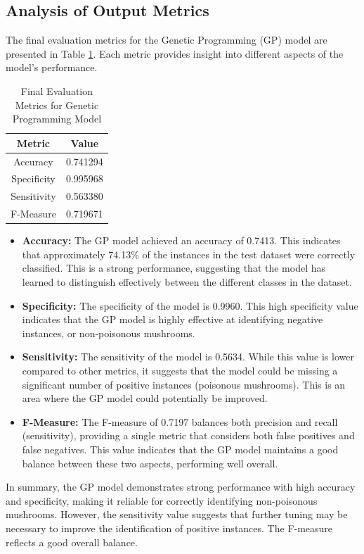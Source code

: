 \documentclass{article}
\begin{document}
\subsection{Analysis of Output Metrics}
The final evaluation metrics for the Genetic Programming (GP) model are presented in Table \ref{tab:gp_final_results}. Each metric provides insight into different aspects of the model's performance.

\begin{table}[h!]
    \centering
    \label{tab:gp_final_results}
    \begin{tabular}{|c|c|}
        \hline
        \textbf{Metric} & \textbf{Value} \\
        \hline
        Accuracy & 0.741294 \\
        Specificity & 0.995968 \\
        Sensitivity & 0.563380 \\
        F-Measure & 0.719671 \\
        \hline
    \end{tabular}
     \caption{Final Evaluation Metrics for Genetic Programming Model}
\end{table}

\begin{itemize}
\item \textbf{Accuracy:} The GP model achieved an accuracy of 0.7413. This indicates that approximately 74.13\% of the instances in the test dataset were correctly classified. This is a strong performance, suggesting that the model has learned to distinguish effectively between the different classes in the dataset.

\item \textbf{Specificity:} The specificity of the model is 0.9960. This high specificity value indicates that the GP model is highly effective at identifying negative instances, or non-poisonous mushrooms.

\item \textbf{Sensitivity:} The sensitivity of the model is 0.5634. While this value is lower compared to other metrics, it suggests that the model could be missing a significant number of positive instances (poisonous mushrooms). This is an area where the GP model could potentially be improved.

\item \textbf{F-Measure:} The F-measure of 0.7197 balances both precision and recall (sensitivity), providing a single metric that considers both false positives and false negatives. This value indicates that the GP model maintains a good balance between these two aspects, performing well overall.
\end{itemize}
In summary, the GP model demonstrates strong performance with high accuracy and specificity, making it reliable for correctly identifying non-poisonous mushrooms. However, the sensitivity value suggests that further tuning may be necessary to improve the identification of positive instances. The F-measure reflects a good overall balance.
\end{document}
